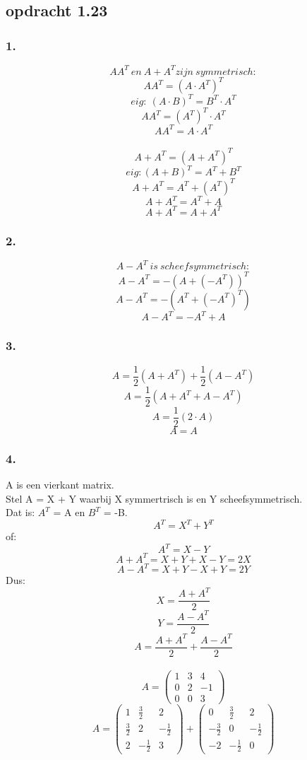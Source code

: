 \documentclass[10pt,a4paper]{article}
\begin{document}
\subsection*{opdracht 1.23}
\subsubsection*{1.}
\[
AA^T \ en \ A + A^T zijn \ symmetrisch:
\]
\[
AA^T = (A\cdot A^T)^T
\]
$$eig: \ (A\cdot B)^T = B^T \cdot A^T $$
$$AA^T = (A^T)^T \cdot A^T$$
$$AA^T = A \cdot A^T$$
\\
$$A +A^T = (A +A^T)^T$$
$$eig: (A+B)^T = A^T + B^T$$
$$A +A^T = A^T + (A^T)^T$$
$$A +A^T = A^T + A$$
$$A +A^T = A + A^T$$
\subsubsection*{2.}
$$A - A^T \ is \ scheefsymmetrisch:$$
$$A - A^T = -(A+(-A^T))^T$$
$$A - A^T = -(A^T + (-A^T)^T)$$
$$A - A^T = -A^T + A$$
\subsubsection*{3.}
$$ A =  \frac{1}{2}(A + A^T) + \frac{1}{2}(A - A^T)$$
$$ A = \frac{1}{2}(A + A^T + A - A^T)$$
$$ A = \frac{1}{2}(2\cdot A)$$
$$ A = A$$
\subsubsection*{4.}
A is een vierkant matrix.\\
Stel A = X + Y waarbij X symmertrisch is en Y scheefsymmetrisch.\\
Dat is: $A^T$ = A en $B^T$ = -B.\\
$$A^T = X^T + Y^T$$
of: $$A^T = X - Y$$
$$A + A^T = X + Y + X - Y = 2X$$
$$A - A^T = X + Y - X + Y = 2Y$$
Dus:
$$X = \frac{A + A^T}{2}$$
$$Y = \frac{A - A^T}{2}$$
$$A = \frac{A + A^T}{2} + \frac{A - A^T}{2}$$
\\
$$
A = \begin{pmatrix}
1 & 3 & 4\\
0 & 2 & -1\\
0 & 0 & 3
\end{pmatrix}
$$
$$
A = \begin{pmatrix}
1 & \frac{3}{2} & 2\\
\frac{3}{2} & 2 & -\frac{1}{2}\\
2 & -\frac{1}{2} & 3
\end{pmatrix}
+
\begin{pmatrix}
0 & \frac{3}{2} & 2\\
-\frac{3}{2} & 0 & -\frac{1}{2}\\
-2 & -\frac{1}{2} & 0
\end{pmatrix}
$$
\end{document}
